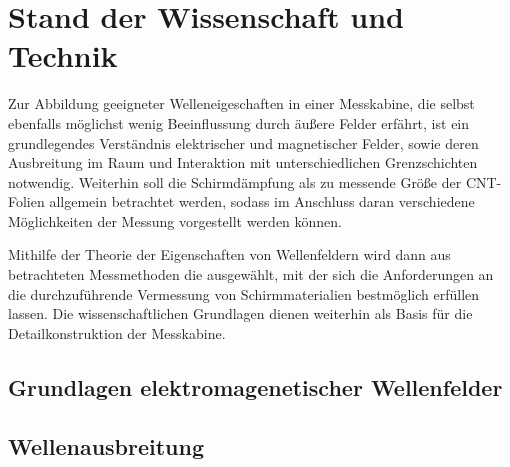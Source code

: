 

\chapter{Stand der Wissenschaft und Technik}\label{cha:2}

Zur Abbildung geeigneter Welleneigeschaften in einer Messkabine, die selbst ebenfalls möglichst wenig Beeinflussung durch äußere Felder erfährt, ist ein grundlegendes Verständnis elektrischer und magnetischer Felder, sowie deren Ausbreitung im Raum und Interaktion mit unterschiedlichen Grenzschichten notwendig. Weiterhin soll die Schirmdämpfung als zu messende Größe der CNT-Folien allgemein betrachtet werden, sodass im Anschluss daran verschiedene Möglichkeiten der Messung vorgestellt werden können. \par
\vspace{\linespace}
Mithilfe der Theorie der Eigenschaften von Wellenfeldern wird dann aus betrachteten Messmethoden die ausgewählt, mit der sich die Anforderungen an die durchzuführende Vermessung von Schirmmaterialien bestmöglich erfüllen lassen. Die wissenschaftlichen Grundlagen dienen weiterhin als Basis für die Detailkonstruktion der Messkabine.


\section{Grundlagen elektromagenetischer Wellenfelder}\label{cha:2_Grundlagen}




\section{Wellenausbreitung}\label{cha:2_Wellenausbreitung}

